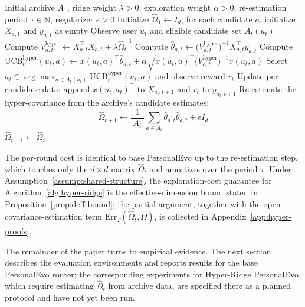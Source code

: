 \documentclass{article} %
\providecommand{\Err}{\mathrm{Err}}
\begin{document}
\begin{algorithm}[t]
\caption{Hyper-Ridge PersonalEvo routing}
\label{alg:hyper-ridge}
\begin{algorithmic}[1]
\Require Initial archive $A_1$, ridge weight $\lambda > 0$, exploration
  weight $\alpha > 0$, re-estimation period $\tau \in \mathbb{N}$,
  regularizer $\epsilon > 0$
\State Initialize $\widehat{\Omega}_1 \gets I_d$; for each candidate $a$,
  initialize $X_{a,1}$ and $y_{a,1}$ as empty
  \State Observe user $u_t$ and eligible candidate set $A_t(u_t)$
    \State Compute
      $V_{a,t}^{\mathrm{hyper}} \gets X_{a,t}^\top X_{a,t}
        + \lambda \widehat{\Omega}_t^{-1}$
    \State Compute
      $\widehat{\theta}_{a,t} \gets
        \bigl( V_{a,t}^{\mathrm{hyper}} \bigr)^{-1}
        X_{a,t}^\top y_{a,t}$
    \State Compute
      $\mathrm{UCB}_t^{\mathrm{hyper}}(u_t, a) \gets
        x(u_t, a)^\top \widehat{\theta}_{a,t}
        + \alpha \sqrt{ x(u_t, a)^\top
          \bigl( V_{a,t}^{\mathrm{hyper}} \bigr)^{-1} x(u_t, a) }$
  \EndFor
  \State Select
    $a_t \in \arg\max_{a \in A_t(u_t)} \mathrm{UCB}_t^{\mathrm{hyper}}(u_t, a)$
    and observe reward $r_t$
  \State Update per-candidate data: append $x(u_t, a_t)^\top$ to
    $X_{a_t, t+1}$ and $r_t$ to $y_{a_t, t+1}$
    \State Re-estimate the hyper-covariance from the archive's
      candidate estimates:
      \[
        \widehat{\Omega}_{t+1} \gets
          \frac{1}{|A_t|} \sum_{a \in A_t}
          \widehat{\theta}_{a,t} \widehat{\theta}_{a,t}^\top
          + \epsilon I_d
      \]
  \Else
    \State $\widehat{\Omega}_{t+1} \gets \widehat{\Omega}_t$
  \EndIf
\EndFor
\end{algorithmic}
\end{algorithm}

The per-round cost is identical to base PersonalEvo up to the
re-estimation step, which touches only the $d \times d$ matrix
$\widehat{\Omega}_t$ and amortizes over the period $\tau$. Under
Assumption~\ref{assump:shared-structure}, the exploration-cost guarantee for
Algorithm~\ref{alg:hyper-ridge} is the effective-dimension bound stated in
Proposition~\ref{prop:deff-bound}; the partial argument, together with the
open covariance-estimation term $\Err_T(\widehat{\Omega}_t, \Omega)$, is
collected in Appendix~\ref{app:hyper-proofs}.

The remainder of the paper turns to empirical evidence. The next section
describes the evaluation environments and reports results for the base
PersonalEvo router; the corresponding experiments for Hyper-Ridge
PersonalEvo, which require estimating $\widehat{\Omega}_t$ from archive
data, are specified there as a planned protocol and have not yet been run.
\end{document}

